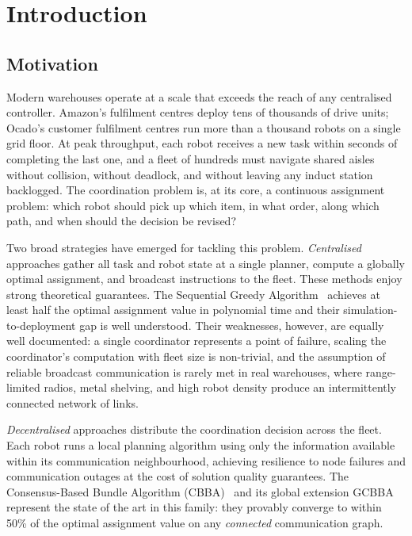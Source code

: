 \chapter{Introduction}
\label{chap:introduction}


\section{Motivation}
\label{sec:intro_motivation}

Modern warehouses operate at a scale that exceeds the reach of any centralised
controller.
Amazon's fulfilment centres deploy tens of thousands of drive units; Ocado's
customer fulfilment centres run more than a thousand robots on a single grid
floor.
At peak throughput, each robot receives a new task within seconds of completing
the last one, and a fleet of hundreds must navigate shared aisles without
collision, without deadlock, and without leaving any induct station backlogged.
The coordination problem is, at its core, a continuous assignment problem:
which robot should pick up which item, in what order, along which path, and
when should the decision be revised?

Two broad strategies have emerged for tackling this problem.
\emph{Centralised} approaches gather all task and robot state at a single
planner, compute a globally optimal assignment, and broadcast instructions to
the fleet.
These methods enjoy strong theoretical guarantees. The Sequential Greedy
Algorithm~\cite{minoux1978accelerated} achieves at least half the optimal
assignment value in polynomial time and their simulation-to-deployment gap
is well understood.
Their weaknesses, however, are equally well documented: a single coordinator
represents a point of failure, scaling the coordinator's computation with fleet
size is non-trivial, and the assumption of reliable broadcast communication
is rarely met in real warehouses, where range-limited radios, metal shelving,
and high robot density produce an intermittently connected network of links.

\emph{Decentralised} approaches distribute the coordination decision across
the fleet.
Each robot runs a local planning algorithm using only the information available
within its communication neighbourhood, achieving resilience to node failures
and communication outages at the cost of solution quality guarantees.
The Consensus-Based Bundle Algorithm (CBBA)~\cite{choi2009consensus} and its
global extension GCBBA~\cite{kha2025enhancing} represent the state of the art
in this family: they provably converge to within 50\% of the optimal
assignment value on any \emph{connected} communication graph.

